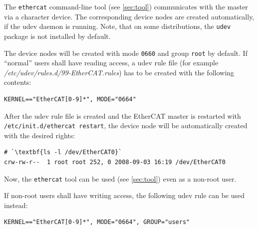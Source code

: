 \documentclass[a4paper,12pt,BCOR=6mm,bibtotoc,idxtotoc]{scrbook}
\begin{document}
The \lstinline+ethercat+ command-line tool (see \autoref{sec:tool})
communicates with the master via a character device. The corresponding device
nodes are created automatically, if the udev daemon is running.  Note, that on
some distributions, the \lstinline+udev+ package is not installed by default.

The device nodes will be created with mode \lstinline+0660+ and group
\lstinline+root+ by default. If ``normal'' users shall have reading access, a
udev rule file (for example \textit{/etc/udev/rules.d/99-EtherCAT.rules}) has
to be created with the following contents:

\begin{lstlisting}
KERNEL=="EtherCAT[0-9]*", MODE="0664"
\end{lstlisting}

After the udev rule file is created and the EtherCAT master is restarted with
\lstinline[breaklines=true]+/etc/init.d/ethercat restart+, the device node
will be automatically created with the desired rights:

\begin{lstlisting}
# `\textbf{ls -l /dev/EtherCAT0}`
crw-rw-r--  1 root root 252, 0 2008-09-03 16:19 /dev/EtherCAT0
\end{lstlisting}

Now, the \lstinline+ethercat+ tool can be used (see \autoref{sec:tool}) even
as a non-root user.

If non-root users shall have writing access, the following udev rule can be
used instead:

\begin{lstlisting}
KERNEL=="EtherCAT[0-9]*", MODE="0664", GROUP="users"
\end{lstlisting}

\end{document}
